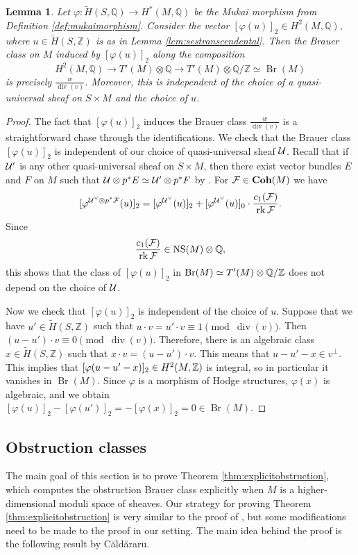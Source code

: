 \documentclass[11pt,twoside]{amsart}
\numberwithin{equation}{section}
\newtheorem{lemma}[dummy]{Lemma}
\theoremstyle{definition}
\theoremstyle{plain}
\newcommand{\Z}{\ensuremath{\mathbb{Z}}}
\newcommand{\Q}{\ensuremath{\mathbb{Q}}}
\def\NS{\operatorname{NS}}
\def\Br{\operatorname{Br}}
\def\rk{\operatorname{rk}}
\def\dv{\operatorname{div}}
\begin{document}
\begin{lemma}\label{lem:mukaimorphismcharacterisationoftheobstruction}
    Let $\varphi: \tilde{H}(S,\Q) \to H^*(M,\Q)$ be the Mukai morphism from Definition \ref{def:mukaimorphism}. Consider the vector $[\varphi(u)]_2\in H^2(M,\Q)$, where $u\in \tilde{H}(S,\Z)$ is as in Lemma \ref{lem:sestranscendental}. Then the Brauer class on $M$ induced by $[\varphi(u)]_2$ along the composition $$H^2(M,\Q)\to T'(M)\otimes \Q\to T'(M)\otimes \Q/\Z\simeq \Br(M)$$ is precisely $\frac{w}{\dv(v)}$. Moreover, this is independent of the choice of a quasi-universal sheaf on $S\times M$ and the choice of $u$.
\end{lemma}
\begin{proof}
    The fact that $[\varphi(u)]_2$ induces the Brauer class $\frac{w}{\dv(v)}$ is a straightforward chase through the identifications.
    We check that the Brauer class $[\varphi(u)]_2$ is independent of our choice of quasi-universal sheaf $\mathcal{U}$. Recall that if $\mathcal{U}'$ is any other quasi-universal sheaf on $S\times M$, then there exist vector bundles $E$ and $F$ on $M$ such that $\mathcal{U}\otimes p^*E\simeq \mathcal{U}'\otimes p^*F$ by \cite[Appendix 2]{Muk87}.
    For $\mathcal{F}\in\operatorname{\mathbf{Coh}}(M)$ we have $$[\varphi^{\calU^\vee\otimes p^*\calF}(u)]_2 = [\varphi^{\calU^\vee}(u)]_2+[\varphi^{\calU^\vee}(u)]_0\cdot \frac{c_1(\calF)}{\rk\calF}.$$ Since $$\frac{c_1(\calF)}{\rk\calF}\in \NS(M)\otimes \Q,$$ this shows that the class of $[\varphi(u)]_2$ in $\Br(M)\simeq T'(M)\otimes \matQ/\matZ$ does not depend on the choice of $\mathcal{U}$.

    Now we check that $[\varphi(u)]_2$ is independent of the choice of $u$. Suppose that we have $u'\in \tilde{H}(S,\Z)$ such that $u\cdot v = u'\cdot v \equiv 1\pmod{\dv(v)}$. Then $(u-u')\cdot v\equiv 0\pmod{\dv(v)}$. Therefore, there is an algebraic class $x\in \tilde{H}(S,\Z)$ such that $x\cdot v = (u-u')\cdot v$. This means that $u-u'-x\in v^\perp$. This implies that $[\varphi(u-u'-x)]_2\in H^2(M,\mathbb{Z})$ is integral, so in particular it vanishes in $\Br(M)$. Since $\varphi$ is a morphism of Hodge structures, $\varphi(x)$ is algebraic, and we obtain $[\varphi(u)]_2 - [\varphi(u')]_2 = -[\varphi(x)]_2=0\in \Br(M)$. 
\end{proof}

\subsection{Obstruction classes}
\label{sec:identifyingobstructionclass}
The main goal of this section is to prove Theorem \ref{thm:explicitobstruction}, which computes the obstruction Brauer class explicitly when $M$ is a higher-dimensional moduli space of sheaves. Our strategy for proving Theorem \ref{thm:explicitobstruction} is very similar to the proof of \cite[Theorem 1.1]{Cal02}, but some modifications need to be made to the proof in our setting. 
The main idea behind the proof is the following result by C\u ald\u araru.
\end{document}
